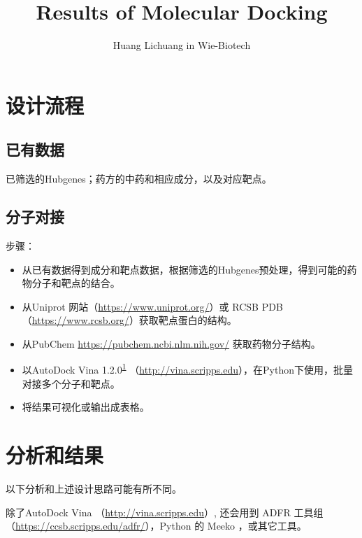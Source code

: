 \documentclass[
]{article}
\title{Results of Molecular Docking}
\author{Huang Lichuang in Wie-Biotech}
\date{}
\providecommand{\tightlist}{%
  \setlength{\itemsep}{0pt}\setlength{\parskip}{0pt}}
\begin{document}
\maketitle

{
\setcounter{tocdepth}{3}
\tableofcontents
}
\hypertarget{ux8bbeux8ba1ux6d41ux7a0b}{%
\section{设计流程}\label{ux8bbeux8ba1ux6d41ux7a0b}}

\hypertarget{ux5df2ux6709ux6570ux636e}{%
\subsection{已有数据}\label{ux5df2ux6709ux6570ux636e}}

已筛选的Hubgenes；药方的中药和相应成分，以及对应靶点。

\hypertarget{ux5206ux5b50ux5bf9ux63a5}{%
\subsection{分子对接}\label{ux5206ux5b50ux5bf9ux63a5}}

步骤：

\begin{itemize}
\tightlist
\item
  从已有数据得到成分和靶点数据，根据筛选的Hubgenes预处理，得到可能的药物分子和靶点的结合。
\item
  从Uniprot 网站（\url{https://www.uniprot.org/}）或 RCSB PDB（\url{https://www.rcsb.org/}）获取靶点蛋白的结构。
\item
  从PubChem \url{https://pubchem.ncbi.nlm.nih.gov/} 获取药物分子结构。
\item
  以AutoDock Vina 1.2.0\textsuperscript{\protect\hyperlink{ref-AutodockVina1Eberha2021}{1}} （\url{http://vina.scripps.edu}），在Python下使用，批量对接多个分子和靶点。
\item
  将结果可视化或输出成表格。
\end{itemize}

\hypertarget{ux5206ux6790ux548cux7ed3ux679c}{%
\section{分析和结果}\label{ux5206ux6790ux548cux7ed3ux679c}}

以下分析和上述设计思路可能有所不同。

除了AutoDock Vina （\url{http://vina.scripps.edu}）, 还会用到 ADFR 工具组（\url{https://ccsb.scripps.edu/adfr/}），Python 的 Meeko ，或其它工具。
\end{document}
